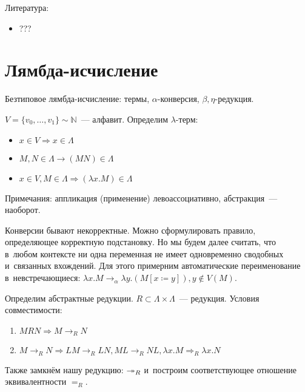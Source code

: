 \documentclass{article}
\begin{document}
Литература:
\begin{itemize}
	\item ???
\end{itemize}

\section{Лямбда-исчисление}

Безтиповое лямбда-исчисление: термы, $\alpha$-конверсия, $\beta, \eta$-редукция.

\begin{definition}
	$V = \{v_0, \ldots, v_1\} \sim \mathbb{N}$~--- алфавит. Определим $\lambda$-терм:
	\begin{itemize}
		\item $x \in V \Rightarrow x \in \Lambda$
		\item $M, N \in \Lambda \rightarrow (MN) \in \Lambda$
		\item $x \in V, M \in \Lambda \Rightarrow (\lambda x.M) \in \Lambda$
	\end{itemize}
\end{definition}

\begin{remark}
	Примечания: аппликация (применение) левоассоциативно, абстракция~--- наоборот.

	Конверсии бывают некорректные. Можно сформулировать правило, определяющее корректную подстановку.
	Но мы будем далее считать, что в~любом контексте ни одна переменная не имеет одновременно
	сводобных и~связанных вхождений. Для этого примерним автоматические переименование
	в~невстречающиеся: $\lambda x. M \rightarrow_\alpha \lambda y.(M[x \coloneqq y]), y \notin V(M)$.
\end{remark}

\begin{definition}
	Определим абстрактные редукции. $R \subset \Lambda \times \Lambda$~--- редукция. Условия
	совместимости:
	\begin{enumerate}
		\item $MRN \Rightarrow M \rightarrow_R N$
		\item $M \rightarrow_R N \Rightarrow LM \rightarrow_R LN, ML \rightarrow_R NL, \lambda x.M
			\Rightarrow_R \lambda x.N$
	\end{enumerate}

	Также замкнём нашу редукцию: $\twoheadrightarrow_R$ и~построим соответствующее отношение эквивалентности
	$=_R$.
\end{definition}
\end{document}
